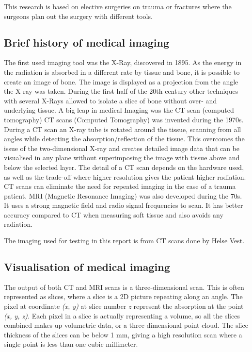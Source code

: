 \documentclass[a4paper]{report}
\begin{document}
This research is based on elective surgeries on trauma or fractures where the surgeons plan out the surgery with different tools. 

\subsection{Brief history of medical imaging}
The first used imaging tool was the X-Ray, discovered in 1895\cite{hamblen_outline_2010}\cite{suetens_fundamentals_2017}. As the energy in the radiation is absorbed in a different rate by tissue and bone, it is possible to create an image of bone. The image is displayed as a projection from the angle the X-ray was taken. During the first half of the 20th century other techniques with several X-Rays allowed to isolate a slice of bone without over- and underlying tissue. A big leap in medical Imaging was the CT scan (computed tomography)\cite{bradley_history_2008}
CT scans (Computed Tomography) was invented during the 1970s. During a CT scan an X-ray tube is rotated around the tissue, scanning from all angles while detecting the absorption/reflection of the tissue. This overcomes the issue of the two-dimensional X-ray and creates detailed image data that can be visualised in any plane without superimposing the image with tissue above and below the selected layer\cite{hamblen_outline_2010}. The detail of a CT scan depends on the hardware used, as well as the trade-off where higher resolution gives the patient higher radiation\cite{bradley_history_2008}. CT scans can eliminate the need for repeated imaging in the case of a trauma patient\cite{swiontkowski_manual_2013}.
MRI (Magnetic Resonance Imaging) was also developed during the 70s. It uses a strong magnetic field and radio signal frequencies to scan. It has better accuracy compared to CT when measuring soft tissue and also avoids any radiation. 

The imaging used for testing in this report is from CT scans done by Helse Vest.

\subsection{Visualisation of medical imaging}
The output of both CT and MRI scans is a three-dimensional scan. This is often represented as slices, where a slice is a 2D picture repeating along an angle. The pixel at coordinate \emph{(x, y)} at slice number \emph{z} represent the absorption at the point \emph{(x, y, z)}\cite{chougule_conversions_2013}.
Each pixel in a slice is actually representing a volume, so all the slices combined makes up volumetric data, or a three-dimensional point cloud\cite{chougule_conversions_2013}. 
The slice thickness of the slices can be below 1 mm, giving a high resolution scan where a single point is less than one cubic millimeter\cite{hamblen_outline_2010}.
\end{document}
